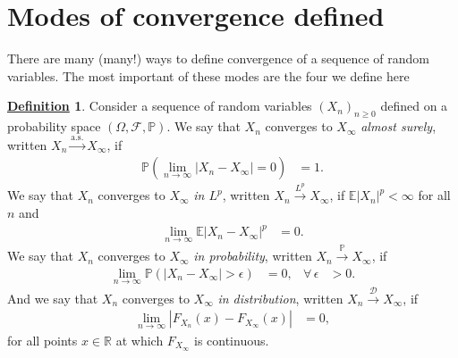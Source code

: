 \documentclass[12pt]{book}
\let\varepsilon\epsilon
\numberwithin{equation}{chapter}
\theoremstyle{plain}
\numberwithin{theorem}{section}
\theoremstyle{definition}
\newtheorem{definition}[theorem]{\underline{Definition}}
\numberwithin{exercise}{chapter}
\newcommand{\<}{\langle}
\renewcommand{\>}{\rangle}
\renewcommand{\(}{\left(}
\renewcommand{\)}{\right)}
\renewcommand{\[}{\left[}
\renewcommand{\]}{\right]}
\newcommand\Eb{\mathds{E}}
\newcommand\Pb{\mathds{P}}
\newcommand\Rb{\mathds{R}}
\newcommand\Dc{\mathscr{D}}
\newcommand\Fc{\mathscr{F}}
\newcommand\eps{\varepsilon}
\newcommand\Om{\Omega}
\begin{document}
\section{Modes of convergence defined}
\label{sec:convergence.defs}
There are many (many!) ways to define convergence of a sequence of random variables.  The most important of these modes are the four we define here
\begin{definition}
Consider a sequence of random variables $(X_n)_{n \geq 0}$ defined on a probability space $(\Om,\Fc,\Pb)$.
We say that $X_n$ converges to $X_\infty$ \emph{almost surely}, written $X_n \stackrel{\text{a.s.}}{\to} X_\infty$, if
\begin{align}
 \Pb( \lim_{n \to \infty} |X_n - X_\infty| = 0) 
	&= 1 . \label{eq:as.convergence}
\end{align}
We say that $X_n$ converges to $X_\infty$ \emph{in $L^p$}, written $X_n \stackrel{L^p}{\to} X_\infty$, if $\Eb | X_n |^p < \infty$ for all $n$ and
\begin{align}
\lim_{n \to \infty} \Eb | X_n - X_\infty |^p 
	&= 0 . \label{eq:lp.convergence}
\end{align}
We say that $X_n$ converges to $X_\infty$ \emph{in probability}, written $X_n \stackrel{\Pb}{\to} X_\infty$, if
\begin{align}
\lim_{n \to \infty} \Pb( |X_n - X_\infty | > \eps ) 
	&=	0 , &
\forall \, \eps
	&> 0 . \label{eq:p.convergence}
\end{align}
And we say that $X_n$ converges to $X_\infty$ \emph{in distribution}, written $X_n \stackrel{\Dc}{\to} X_\infty$, if
\begin{align}
\lim_{n \to \infty} | F_{X_n}(x) - F_{X_\infty}(x) | 
	&= 0 , \label{eq:d.convergence}
\end{align}
for all points $x \in \Rb$ at which $F_{X_\infty}$ is continuous.
\end{definition}
\end{document}
